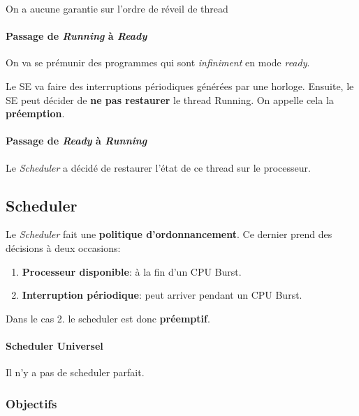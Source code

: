 On a aucune garantie sur l'ordre de réveil de thread

\paragraph{\texorpdfstring{Passage de \emph{Running} à
\emph{Ready}}{Passage de Running à Ready}}\label{passage-de-running-uxe0-ready}

On va se prémunir des programmes qui sont \emph{infiniment} en mode
\emph{ready}.

Le SE va faire des interruptions périodiques générées par une horloge.
Ensuite, le SE peut décider de \textbf{ne pas restaurer} le thread
Running. On appelle cela la \textbf{préemption}.

\paragraph{\texorpdfstring{Passage de \emph{Ready} à
\emph{Running}}{Passage de Ready à Running}}\label{passage-de-ready-uxe0-running}

Le \emph{Scheduler} a décidé de restaurer l'état de ce thread sur le
processeur.

\subsection{Scheduler}\label{scheduler}

Le \emph{Scheduler} fait une \textbf{politique d'ordonnancement}. Ce
dernier prend des décisions à deux occasions:

\begin{enumerate}
\def\labelenumi{\arabic{enumi}.}
\tightlist
\item
  \textbf{Processeur disponible}: à la fin d'un CPU Burst.
\item
  \textbf{Interruption périodique}: peut arriver pendant un CPU Burst.
\end{enumerate}

Dans le cas 2. le scheduler est donc \textbf{préemptif}.

\paragraph{Scheduler Universel}\label{scheduler-universel}

Il n'y a pas de scheduler parfait.

\subsubsection{Objectifs}\label{objectifs}


